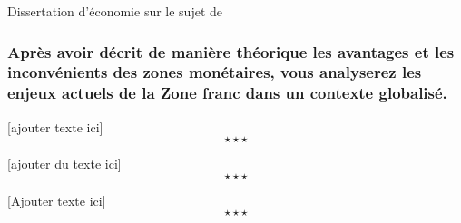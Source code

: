 \newpage \begin{bclogo}[barre=none,logo={}]{Dissertation d'économie sur le sujet de}
		\subsubsection*{Après avoir décrit de manière théorique les avantages et les inconvénients des zones monétaires, vous analyserez les enjeux actuels de la Zone franc dans un contexte globalisé.}
\end{bclogo}

[ajouter texte ici] $$\star \star \star$$

[ajouter du texte ici]$$\star \star \star$$

[Ajouter texte ici] $$\star \star \star$$
